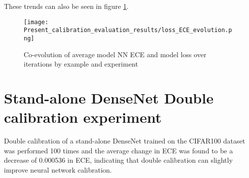 

These trends can also be seen in figure \ref{fig:loss_ECE_evolution}.
\begin{figure}[htbp!]
  \centering
  \texttt{[image: Present\_calibration\_evaluation\_results/loss\_ECE\_evolution.png]}
  \caption[Co-evolution of average model NN ECE and model loss over iterations by example and experiment]{Co-evolution of average model NN ECE and model loss over iterations by example and experiment}
  \label{fig:loss_ECE_evolution}
\end{figure}
\newpage

\section{Stand-alone DenseNet Double calibration experiment}
Double calibration of a stand-alone DenseNet trained on the CIFAR100 dataset was performed 100 times and the average change in ECE was found to be a decrease of 0.000536 in ECE, indicating that double calibration can slightly improve neural network calibration.